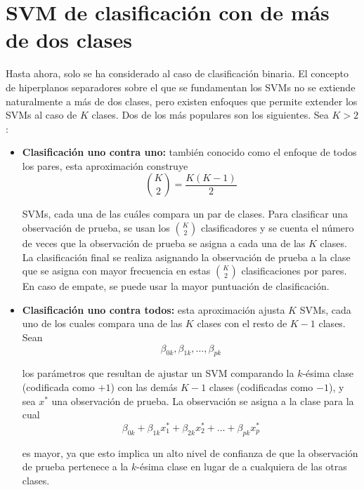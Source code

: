 \section{SVM de clasificación con de más de dos clases}

Hasta ahora, solo se ha considerado al caso de clasificación binaria. El concepto de hiperplanos separadores sobre el que se fundamentan los SVMs no se extiende naturalmente a más de dos clases, pero existen enfoques que permite extender los SVMs al caso de $K$ clases. Dos de los más populares son los siguientes. Sea $K > 2$:
\begin{itemize}
\item \textbf{Clasificación uno contra uno:} también conocido como el enfoque de todos los pares, esta aproximación construye 
\begin{equation}
\binom{K}{2} = \frac{K(K-1)}{2}
\end{equation} 

SVMs, cada una de las cuáles compara un par de clases. Para clasificar una observación de prueba, se usan los $\binom{K}{2}$ clasificadores y se cuenta el número de veces que la observación de prueba se asigna a cada una de las $K$ clases. La clasificación final se realiza asignando la observación de prueba a la clase que se asigna con mayor frecuencia en estas $\binom{K}{2}$ clasificaciones por pares. En caso de empate, se puede usar la mayor puntuación de clasificación.
\item \textbf{Clasificación uno contra todos:} esta aproximación ajusta $K$ SVMs, cada uno de los cuales compara una de las $K$ clases con el resto de $K - 1$ clases. Sean 
\begin{equation}
\beta_{0k}, \beta_{1k}, \ldots, \beta_{pk}
\end{equation}

los parámetros que resultan de ajustar un SVM comparando la $k$-ésima clase (codificada como $+1$) con las demás $K - 1$ clases (codificadas como $-1$), y sea $x^*$ una observación de prueba. La observación se asigna a la clase para la cual 
\begin{equation}
\beta_{0k} + \beta_{1k} x^*_1 + \beta_{2k} x^*_2 + \ldots + \beta_{pk} x^*_p
\end{equation}

es mayor, ya que esto implica un alto nivel de confianza de que la observación de prueba pertenece a la $k$-ésima clase en lugar de a cualquiera de las otras clases.
\end{itemize}




